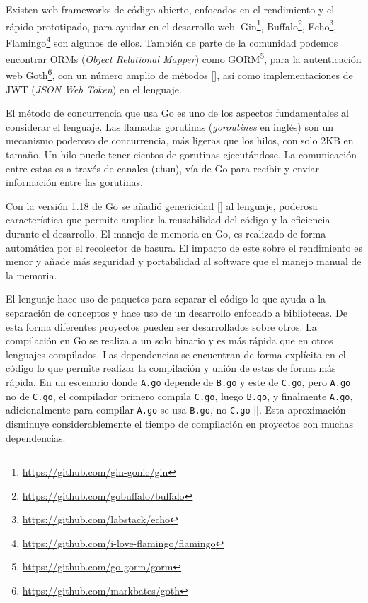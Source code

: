 Existen web frameworks de código abierto, enfocados en el rendimiento y el rápido prototipado, para ayudar en el desarrollo web. Gin\footnote{\url{https://github.com/gin-gonic/gin}}, Buffalo\footnote{\url{https://github.com/gobuffalo/buffalo}}, Echo\footnote{\url{https://github.com/labstack/echo}}, Flamingo\footnote{\url{https://github.com/i-love-flamingo/flamingo}} son algunos de ellos. También de parte de la comunidad podemos encontrar ORMs (\textit{Object Relational Mapper}) como GORM\footnote{\url{https://github.com/go-gorm/gorm}}, para la autenticación web Goth\footnote{\url{https://github.com/markbates/goth}}, con un número amplio de métodos [\cite{goth}], así como implementaciones de JWT (\textit{JSON Web Token}) en el lenguaje.

El método de concurrencia que usa Go es uno de los aspectos fundamentales al considerar el lenguaje. Las llamadas gorutinas (\textit{goroutines} en inglés) son un mecanismo poderoso de concurrencia, más ligeras que los hilos, con solo 2KB en tamaño. Un hilo puede tener cientos de gorutinas ejecutándose. La comunicación entre estas es a través de canales (\verb+chan+), vía de Go para recibir y enviar información entre las gorutinas.

Con la versión 1.18 de Go se añadió genericidad [\cite{go-generics}] al lenguaje, poderosa característica que permite ampliar la reusabilidad del código y la eficiencia durante el desarrollo. El manejo de memoria en Go, es realizado de forma automática por el recolector de basura. El impacto de este sobre el rendimiento es menor y añade más seguridad y portabilidad al software que el manejo manual de la memoria.

El lenguaje hace uso de paquetes para separar el código lo que ayuda a la separación de conceptos y hace uso de un desarrollo enfocado a bibliotecas. De esta forma diferentes proyectos pueden ser desarrollados sobre otros. La compilación en Go se realiza a un solo binario y es más rápida que en otros lenguajes compilados. Las dependencias se encuentran de forma explícita en el código lo que permite realizar la compilación y unión de estas de forma más rápida. En un escenario donde \verb+A.go+ depende de \verb+B.go+ y este de \verb+C.go+, pero \verb+A.go+ no de \verb+C.go+, el compilador primero compila \verb+C.go+, luego \verb+B.go+, y finalmente \verb+A.go+, adicionalmente para compilar \verb+A.go+ se usa \verb+B.go+, no \verb+C.go+ [\cite{go-deps}]. Esta aproximación disminuye considerablemente el tiempo de compilación en proyectos con muchas dependencias.


